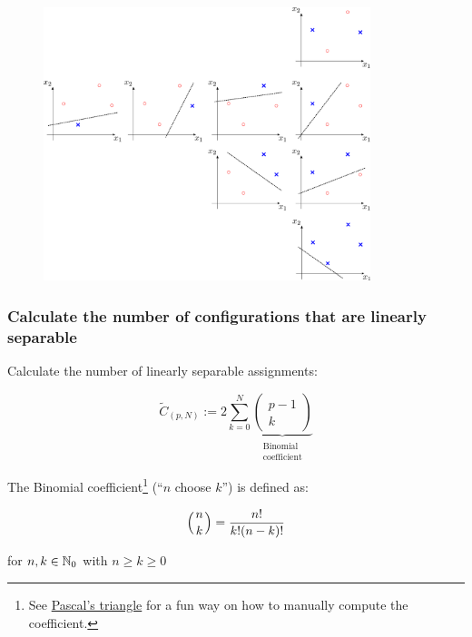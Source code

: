 \begin{frame}
		\begin{figure}[h]
			\centering
			\includegraphics[width=0.85\textwidth]{img/linearly_sep}
		\end{figure}
\end{frame}

\begin{frame}\frametitle{Calculate the number of configurations that are linearly separable}

Calculate the number of linearly separable assignments:

\begin{equation}
	\tilde C_{(p,N)} := 2 \sum_{k=0}^{N} 
	\underbrace{
	\left( \begin{array}{c}
	p-1\\
	k
	\end{array}\right)
	}_{\substack{\text{Binomial}\\ \text{coefficient}}}
\end{equation}

The Binomial coefficient\footnote{
See \href{https://en.wikipedia.org/wiki/Pascal\%27s_triangle}{Pascal's triangle} for a fun way on how to manually compute the coefficient.
} 
(``$n$ choose $k$'') 
is defined as:

\begin{equation}
\left(n \atop k \right) = \frac{n!}{k! (n-k)!}
\end{equation}

for $n,k \in \mathbb{N}_0$ with $n \ge k \ge 0$

\end{frame}

